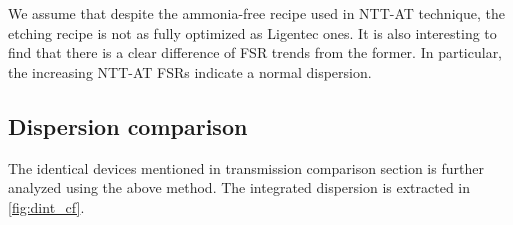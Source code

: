 We assume that despite the ammonia-free recipe used in NTT-AT technique, the etching recipe is not as fully optimized as Ligentec ones. It is also interesting to find that there is a clear difference of FSR trends from the former. In particular, the increasing NTT-AT FSRs indicate a normal dispersion.

%    

%    

\subsection{Dispersion comparison}

The identical devices mentioned in transmission comparison section is further analyzed using the above method. The integrated dispersion is extracted in \autoref{fig:dint_cf}.


\begin{figure}
	\centering
	
	\mycaption{}{}
	\label{fig:dint_cf}
\end{figure}